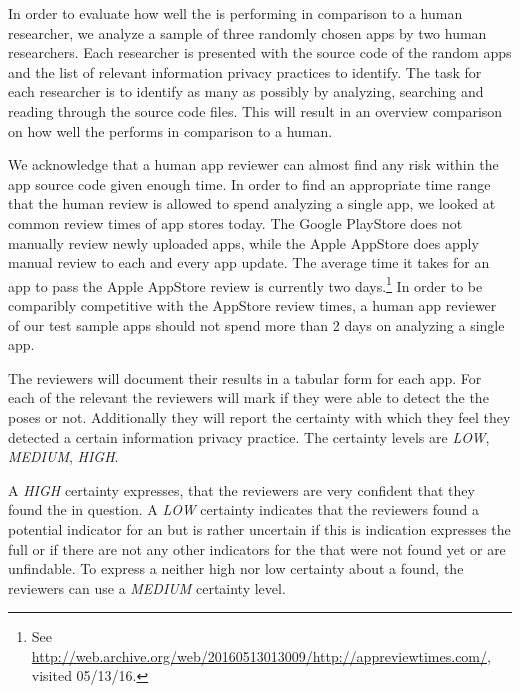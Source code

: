 In order to evaluate how well the \aiprat is performing in comparison to a human researcher, we analyze a sample of three randomly chosen apps by two human researchers.
Each researcher is presented with the source code of the random apps and the list of relevant information privacy practices to identify.
The task for each researcher is to identify as many \ipp as possibly by analyzing, searching and reading through the source code files. 
This will result in an overview comparison on how well the \aiprat performs in comparison to a human.

We acknowledge that a human app reviewer can almost find any \ipp risk within the app source code given enough time.
In order to find an appropriate time range that the human review is allowed to spend analyzing a single app, we looked at common review times of app stores today.
The Google PlayStore does not manually review newly uploaded apps, while the Apple AppStore does apply manual review to each and every app update.
The average time it takes for an app to pass the Apple AppStore review  is currently two days.\footnote{See \url{http://web.archive.org/web/20160513013009/http://appreviewtimes.com/}, visited 05/13/16.}
In order to be comparibly competitive with the AppStore review times, a human app reviewer of our test sample apps should not spend more than 2 days on analyzing a single app.

The reviewers will document their results in a tabular form for each app.
For each of the relevant \ipp the reviewers will mark if they were able to detect the \ipr the \ipp poses or not.
Additionally they will report the certainty with which they feel they detected a certain information privacy practice.
The certainty levels are \textit{LOW}, \textit{MEDIUM}, \textit{HIGH}.

A \textit{HIGH} certainty expresses, that the reviewers are very confident that they found the \ipp in question.
A \textit{LOW} certainty indicates that the reviewers found a potential indicator for an \ipp but is rather uncertain if this is indication expresses the full \ipp or if there are not any other indicators for the \ipp that were not found yet or are unfindable.
To express a neither high nor low certainty about a \ipp found, the reviewers can use a \textit{MEDIUM} certainty level.